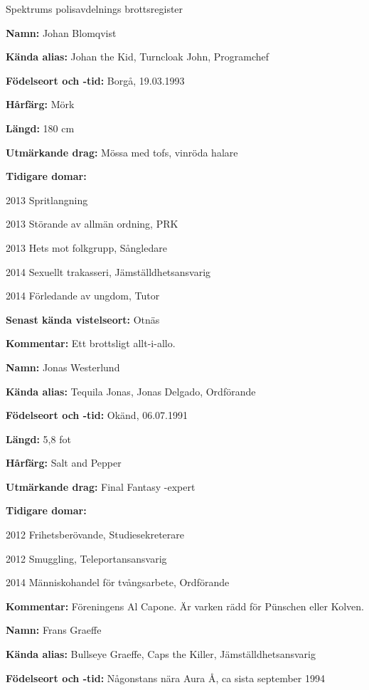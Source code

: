 \documentclass{spektraklet}
\begin{document}
\begin{artikel}{Spektrums polisavdelnings
brottsregister}{}
\begin{twocolumns}
\textbf{Namn:} Johan Blomqvist

\textbf{Kända alias:} Johan the Kid, Turncloak John, Programchef

\textbf{Födelseort och -tid:} Borgå, 19.03.1993

\textbf{Hårfärg:} Mörk

\textbf{Längd:} 180 cm

\textbf{Utmärkande drag:} Mössa med tofs, vinröda halare

\textbf{Tidigare domar:}

		2013 Spritlangning
		
		2013 Störande av allmän ordning, PRK
		
		2013 Hets mot folkgrupp, Sångledare
		
		2014 Sexuellt trakasseri, Jämställdhetsansvarig
		
		2014 Förledande av ungdom, Tutor
		
		
\textbf{Senast kända vistelseort:} Otnäs

\textbf{Kommentar:} Ett brottsligt allt-i-allo.



\textbf{Namn:} Jonas Westerlund

\textbf{Kända alias:} Tequila Jonas, Jonas Delgado, Ordförande

\textbf{Födelseort och -tid:} Okänd, 06.07.1991

\textbf{Längd:} 5,8 fot

\textbf{Hårfärg:} Salt and Pepper

\textbf{Utmärkande drag:} Final Fantasy -expert

\textbf{Tidigare domar:}

		2012	Frihetsberövande, Studiesekreterare
		
		2012	Smuggling, Teleportansansvarig
		
		2014	Människohandel för tvångsarbete, Ordförande

\textbf{Kommentar:} Föreningens Al Capone. Är varken rädd för Pünschen eller Kolven.







\textbf{Namn:} Frans Graeffe

\textbf{Kända alias:} Bullseye Graeffe, Caps the Killer, Jämställdhetsansvarig

\textbf{Födelseort och -tid:} Någonstans nära Aura Å, ca sista september 1994


\end{twocolumns}
\end{artikel}
\end{document}
